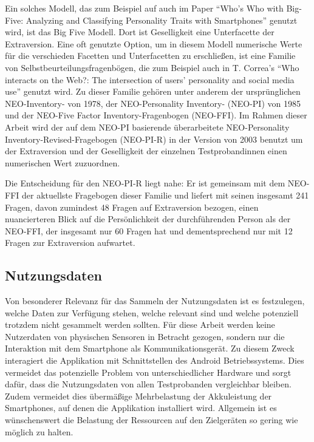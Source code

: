 Ein solches Modell, das zum Beispiel auf auch im Paper "`Who’s Who with Big-Five: Analyzing and Classifying Personality Traits with Smartphones"'\cite{chittaranjan2011s} genutzt wird, ist das Big Five Modell.
Dort ist Geselligkeit eine Unterfacette der Extraversion.
Eine oft genutzte Option, um in diesem Modell numerische Werte für die verschieden Facetten und Unterfacetten zu erschließen, ist eine Familie von Selbstbeurteilungsfragenbögen,
die zum Beispiel auch in T. Correa's "`Who interacts on the Web?: The intersection of users’ personality and social media use"' \cite{butt2008personality} genutzt wird.
Zu dieser Familie gehören unter anderem der ursprünglichen NEO-Inventory-  von 1978, der NEO-Personality Inventory- (NEO-PI) von 1985 und der NEO-Five Factor Inventory-Fragenbogen (NEO-FFI).
Im Rahmen dieser Arbeit wird der auf dem NEO-PI basierende überarbeitete NEO-Personality Inventory-Revised-Fragebogen (NEO-PI-R) in der Version von 2003 benutzt\cite{neopir2003}
um der Extraversion und der Geselligkeit der einzelnen Testprobandinnen einen numerischen Wert zuzuordnen.

Die Entscheidung für den NEO-PI-R liegt nahe: 
Er ist gemeinsam mit dem NEO-FFI der aktuellste Fragebogen dieser Familie und liefert mit seinen insgesamt 241 Fragen, davon zumindest 48 Fragen auf Extraversion bezogen,
einen nuancierteren Blick auf die Persönlichkeit der durchführenden Person als der NEO-FFI, der insgesamt nur 60 Fragen hat und dementsprechend nur mit 12 Fragen zur Extraversion aufwartet.



\subsection{Nutzungsdaten}

Von besonderer Relevanz für das Sammeln der Nutzungsdaten ist es festzulegen, welche Daten zur Verfügung stehen, welche relevant sind und welche potenziell trotzdem nicht gesammelt werden sollten.
Für diese Arbeit werden keine Nutzerdaten von physischen Sensoren in Betracht gezogen, sondern nur die Interaktion mit dem Smartphone als Kommunikationsgerät.
Zu diesem Zweck interagiert die Applikation mit Schnittstellen des Android Betriebssystems.
Dies vermeidet das potenzielle Problem von unterschiedlicher Hardware und sorgt dafür, dass die Nutzungsdaten von allen Testprobanden vergleichbar bleiben.
Zudem vermeidet dies übermäßige Mehrbelastung der Akkuleistung der Smartphones, auf denen die Applikation installiert wird.
Allgemein ist es wünschenswert die Belastung der Ressourcen auf den Zielgeräten so gering wie möglich zu halten.
\par

